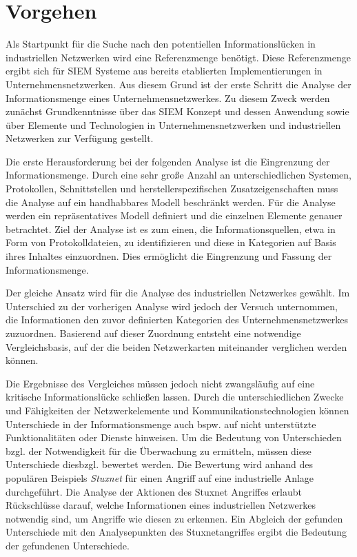 \section{Vorgehen}
Als Startpunkt für die Suche nach den potentiellen Informationslücken in industriellen Netzwerken wird eine Referenzmenge benötigt. Diese Referenzmenge ergibt sich für SIEM Systeme aus bereits etablierten Implementierungen in Unternehmensnetzwerken. Aus diesem Grund ist der erste Schritt die Analyse der Informationsmenge eines Unternehmensnetzwerkes. Zu diesem Zweck werden zunächst Grundkenntnisse über das SIEM Konzept und dessen Anwendung sowie über Elemente und Technologien in Unternehmensnetzwerken und industriellen Netzwerken zur Verfügung gestellt. 

Die erste Herausforderung bei der folgenden Analyse ist die Eingrenzung der Informationsmenge. Durch eine sehr große Anzahl an unterschiedlichen Systemen, Protokollen, Schnittstellen und herstellerspezifischen Zusatzeigenschaften muss die Analyse auf ein handhabbares Modell beschränkt werden. Für die Analyse werden ein repräsentatives Modell definiert und die einzelnen Elemente genauer betrachtet. Ziel der Analyse ist es zum einen, die Informationsquellen, etwa in Form von Protokolldateien, zu identifizieren und diese in Kategorien auf Basis ihres Inhaltes einzuordnen. Dies ermöglicht die Eingrenzung und Fassung der Informationsmenge. 

Der gleiche Ansatz wird für die Analyse des industriellen Netzwerkes gewählt. Im Unterschied zu der vorherigen Analyse wird jedoch der Versuch unternommen, die Informationen den zuvor definierten Kategorien des Unternehmensnetzwerkes zuzuordnen. Basierend auf dieser Zuordnung entsteht eine notwendige Vergleichsbasis, auf der die beiden Netzwerkarten miteinander verglichen werden können.

Die Ergebnisse des Vergleiches müssen jedoch nicht zwangsläufig auf eine kritische Informationslücke schließen lassen. Durch die unterschiedlichen Zwecke und Fähigkeiten der Netzwerkelemente und Kommunikationstechnologien können Unterschiede in der Informationsmenge auch bspw. auf nicht unterstützte Funktionalitäten oder Dienste hinweisen. Um die Bedeutung von Unterschieden bzgl. der Notwendigkeit für die Überwachung zu ermitteln, müssen diese Unterschiede diesbzgl. bewertet werden. Die Bewertung wird anhand des populären Beispiels \textit{Stuxnet} für einen Angriff auf eine industrielle Anlage durchgeführt. Die Analyse der Aktionen des Stuxnet Angriffes erlaubt Rückschlüsse darauf, welche Informationen eines industriellen Netzwerkes notwendig sind, um Angriffe wie diesen zu erkennen. 
Ein Abgleich der gefunden Unterschiede mit den Analysepunkten des Stuxnetangriffes ergibt die Bedeutung der gefundenen Unterschiede.

